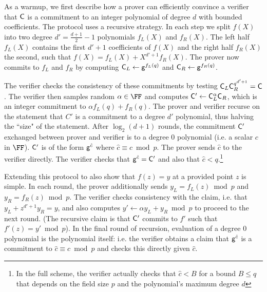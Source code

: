 As a warmup, we first describe how a prover can efficiently convince a verifier that $\mathsf{C}$ is a commitment to an integer polynomial of degree $d$ with bounded coefficients. The protocol uses a recursive strategy. 
In each step we split $f(X)$ into two degree $d'=\frac{d+1}{2}-1$ polynomials $f_L(X)$ and $f_R(X)$. 
The left half $f_L(X)$ contains the first $d'+1$ coefficients of $f(X)$ and the right half $f_R(X)$ the second, such that $f(X)=f_L(X)+X^{d'+1}f_R(X)$. The prover now commits to $f_L$ and $f_R$ by computing $\mathsf{C}_L\gets \mathsf{g}^{f_L(q)}$ and $\mathsf{C}_R\gets \mathsf{g}^{f_R(q)}$.
\begin{comment}
In our running example, $f_L(X)=4X+1$ and $f_R(X)=2X+3$. 
\end{comment} 
The verifier checks the consistency of these commitments by testing $\mathsf{C}_L\mathsf{C}_R^{q^{d'+1}}=\mathsf{C}$. The verifier then samples random  $\alpha \in \FF$ and computes $\mathsf{C}'\gets \mathsf{C}_L^{\alpha}\mathsf{C}_R$, which is an integer commitment to $\alpha f_L(q) + f_R(q)$. The prover and verifier recurse on the statement that $C'$ is a commitment to a degree $d'$ polynomial, thus halving the ``size" of the statement. %
After $\log_2(d+1)$ rounds, the commitment $\mathsf{C}'$ exchanged between prover and verifier is to a degree $0$ polynomial (i.e. a scalar $c$ in $\FF$). $\mathsf{C}'$ is of the form $\mathsf{g}^{\hat{c}}$ where $\hat{c} \equiv c \bmod p$. 
The prover sends $\hat{c}$ to the verifier directly. 
The verifier checks that $\mathsf{g}^{\hat{c}} = \mathsf{C}'$ and also that $\hat{c} < q$.\footnote{In the full scheme, the verifier actually checks that $\hat{c} < B$ for a bound $B \leq q$ that depends on the field size $p$ and the polynomial's maximum degree $d$} 

Extending this protocol to also show that $f(z) = y$ at a provided point $z$ is simple. 
In each round, the prover additionally sends $y_L=f_L(z)\bmod p$ and $y_R=f_R(z)\bmod p$. The verifier checks consistency with the claim, i.e. that $y_L+z^{d'+1}y_R=y$, and also computes $y' \leftarrow \alpha y_L+y_R\bmod p$ to proceed to the next round. (The recursive claim is that $\mathsf{C}'$ commits to $f'$ such that $f'(z) = y' \bmod p$). In the final round of recursion, evaluation of a degree $0$ polynomial is the polynomial itself: i.e. the verifier obtains a claim that $\mathsf{g}^{\hat{c}}$ is a commitment to $\hat{c} \equiv c \bmod p$ and checks this directly given $\hat{c}$. 

